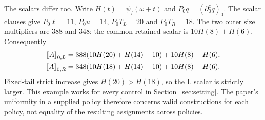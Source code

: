 The scalars differ too. Write $H(t)=\psi_f(\omega+t)$ and
$P_0q=(\partial_0^zq)_0$. The scalar clauses give
$P_0\ell=11$, $P_0u=14$, $P_0T_L=20$ and $P_0T_R=18$.
The two outer size multipliers are 388 and 348; the common retained
scalar is $10H(8)+H(6)$. Consequently
\begin{align*}
 \mathopen{[\![}A\mathclose{]\!]}_{0,L}&=388(10H(20)+H(14)+10)+10H(8)+H(6),\\
 \mathopen{[\![}A\mathclose{]\!]}_{0,R}&=348(10H(18)+H(14)+10)+10H(8)+H(6).
\end{align*}
Fixed-tail strict increase gives $H(20)>H(18)$, so the L scalar is
strictly larger. This example works for every control in
Section~\ref{sec:setting}. The paper's uniformity in a supplied policy
therefore concerns valid constructions for each policy, not equality
of the resulting assignments across policies.
